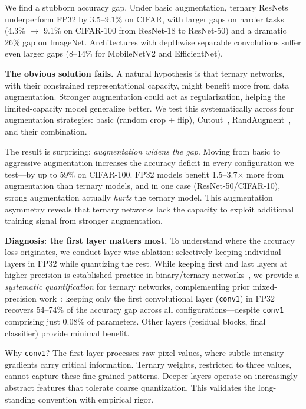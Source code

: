 \documentclass[10pt]{article}
\begin{document}
We find a stubborn accuracy gap. Under basic augmentation, ternary ResNets underperform FP32 by 3.5--9.1\% on CIFAR, with larger gaps on harder tasks (4.3\% $\to$ 9.1\% on CIFAR-100 from ResNet-18 to ResNet-50) and a dramatic 26\% gap on ImageNet. Architectures with depthwise separable convolutions suffer even larger gaps (8--14\% for MobileNetV2 and EfficientNet).

\textbf{The obvious solution fails.} A natural hypothesis is that ternary networks, with their constrained representational capacity, might benefit more from data augmentation. Stronger augmentation could act as regularization, helping the limited-capacity model generalize better. We test this systematically across four augmentation strategies: basic (random crop + flip), Cutout~\cite{devries2017cutout}, RandAugment~\cite{cubuk2020randaugment}, and their combination.

The result is surprising: \emph{augmentation widens the gap}. Moving from basic to aggressive augmentation increases the accuracy deficit in every configuration we test---by up to 59\% on CIFAR-100. FP32 models benefit 1.5--3.7$\times$ more from augmentation than ternary models, and in one case (ResNet-50/CIFAR-10), strong augmentation actually \emph{hurts} the ternary model. This augmentation asymmetry reveals that ternary networks lack the capacity to exploit additional training signal from stronger augmentation.

\textbf{Diagnosis: the first layer matters most.} To understand where the accuracy loss originates, we conduct layer-wise ablation: selectively keeping individual layers in FP32 while quantizing the rest. While keeping first and last layers at higher precision is established practice in binary/ternary networks~\cite{rastegari2016xnornet,zhou2016dorefa}, we provide a \emph{systematic quantification} for \bitnetb{} ternary networks, complementing prior mixed-precision work~\cite{wang2019haq,dong2020hawqv2}: keeping only the first convolutional layer (\texttt{conv1}) in FP32 recovers 54--74\% of the accuracy gap across all configurations---despite \texttt{conv1} comprising just 0.08\% of parameters. Other layers (residual blocks, final classifier) provide minimal benefit.

Why \texttt{conv1}? The first layer processes raw pixel values, where subtle intensity gradients carry critical information. Ternary weights, restricted to three values, cannot capture these fine-grained patterns. Deeper layers operate on increasingly abstract features that tolerate coarse quantization. This validates the long-standing convention with empirical rigor.
\end{document}
